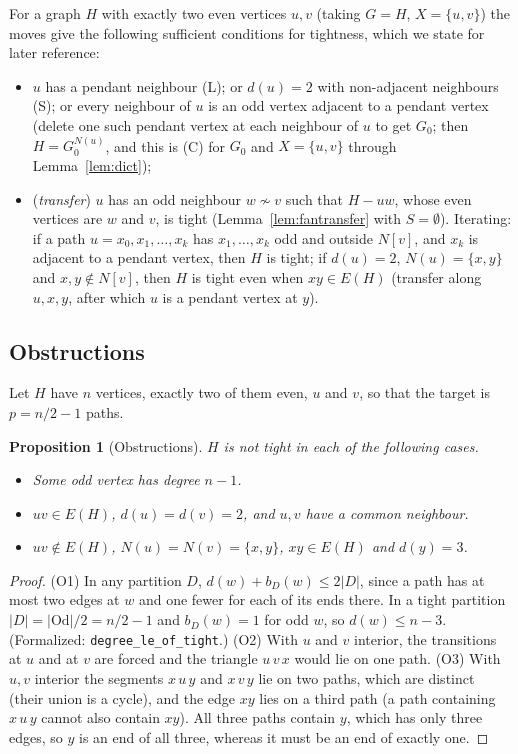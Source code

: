 \documentclass[11pt]{amsart}
\newtheorem{proposition}[theorem]{Proposition}
\theoremstyle{definition}
\newcommand{\Od}{\mathrm{Od}}
\begin{document}
For a graph $H$ with exactly two even vertices $u,v$ (taking $G=H$, $X=\{u,v\}$) the moves give the
following sufficient conditions for tightness, which we state for later reference:
\begin{itemize}
\item $u$ has a pendant neighbour (L); or $d(u)=2$ with non-adjacent neighbours (S); or every
neighbour of $u$ is an odd vertex adjacent to a pendant vertex (delete one such pendant vertex at
each neighbour of $u$ to get $G_0$; then $H=G_0^{N(u)}$, and this is (C) for $G_0$ and $X=\{u,v\}$
through Lemma~\ref{lem:dict});
\item (\emph{transfer}) $u$ has an odd neighbour $w\not\sim v$ such that $H-uw$, whose even vertices
are $w$ and $v$, is tight (Lemma~\ref{lem:fantransfer} with $S=\emptyset$). Iterating: if a path
$u=x_0,x_1,\dots,x_k$ has $x_1,\dots,x_k$ odd and outside $N[v]$, and $x_k$ is adjacent to a
pendant vertex, then $H$ is tight; if $d(u)=2$, $N(u)=\{x,y\}$ and $x,y\notin N[v]$, then $H$ is tight
even when $xy\in E(H)$ (transfer along $u,x,y$, after which $u$ is a pendant vertex at $y$).
\end{itemize}

\subsection{Obstructions}\label{sec:obstructions}

Let $H$ have $n$ vertices, exactly two of them even, $u$ and $v$, so that the target is
$p=n/2-1$ paths.

\begin{proposition}[Obstructions]\label{prop:obstructions}
$H$ is not tight in each of the following cases.
\begin{itemize}
\item[(O1)] Some odd vertex has degree $n-1$.
\item[(O2)] $uv\in E(H)$, $d(u)=d(v)=2$, and $u,v$ have a common neighbour.
\item[(O3)] $uv\notin E(H)$, $N(u)=N(v)=\{x,y\}$, $xy\in E(H)$ and $d(y)=3$.
\end{itemize}
\end{proposition}

\begin{proof}
(O1) In any partition $D$, $d(w)+b_D(w)\le2|D|$, since a path has at most two edges at $w$ and one
fewer for each of its ends there. In a tight partition $|D|=|\Od|/2=n/2-1$ and $b_D(w)=1$ for odd
$w$, so $d(w)\le n-3$. (Formalized: \texttt{degree\_le\_of\_tight}.) (O2) With $u$ and $v$ interior,
the transitions at $u$ and at $v$ are forced and the triangle $u\,v\,x$ would lie on one path. (O3)
With $u,v$ interior the segments $x\,u\,y$ and $x\,v\,y$ lie on two paths, which are distinct (their
union is a cycle), and the edge $xy$ lies on a third path (a path containing $x\,u\,y$ cannot also
contain $xy$). All three paths contain $y$, which has only three edges, so $y$ is an end of all
three, whereas it must be an end of exactly one.
\end{proof}
\end{document}
